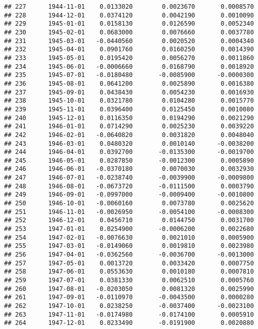 \documentclass[
]{article}
\begin{document}
\begin{verbatim}
## 227      1944-11-01    0.0133020        0.0023670       0.0008570
## 228      1944-12-01    0.0374120        0.0042190       0.0010090
## 229      1945-01-01    0.0158130        0.0126590       0.0052340
## 230      1945-02-01    0.0683000        0.0076660       0.0037780
## 231      1945-03-01   -0.0440560        0.0020520       0.0004340
## 232      1945-04-01    0.0901760        0.0160250       0.0014390
## 233      1945-05-01    0.0195420        0.0056270       0.0011860
## 234      1945-06-01   -0.0006660        0.0168790       0.0018920
## 235      1945-07-01   -0.0180480       -0.0085900      -0.0000300
## 236      1945-08-01    0.0641200        0.0025890       0.0016380
## 237      1945-09-01    0.0438430        0.0054230       0.0016930
## 238      1945-10-01    0.0321780        0.0104280       0.0015770
## 239      1945-11-01    0.0396400        0.0125450       0.0010080
## 240      1945-12-01    0.0116350        0.0194290       0.0021290
## 241      1946-01-01    0.0714290        0.0025230       0.0039220
## 242      1946-02-01   -0.0640820        0.0031820       0.0048040
## 243      1946-03-01    0.0480320        0.0010140      -0.0038200
## 244      1946-04-01    0.0392700       -0.0135300      -0.0019700
## 245      1946-05-01    0.0287850       -0.0012300       0.0005890
## 246      1946-06-01   -0.0370180        0.0070030       0.0032930
## 247      1946-07-01   -0.0238740       -0.0039900      -0.0009800
## 248      1946-08-01   -0.0673720       -0.0111500       0.0003790
## 249      1946-09-01   -0.0997000       -0.0009400      -0.0010800
## 250      1946-10-01   -0.0060160        0.0073780       0.0025620
## 251      1946-11-01   -0.0026950       -0.0054100      -0.0008300
## 252      1946-12-01    0.0456710        0.0144750       0.0031700
## 253      1947-01-01    0.0254900       -0.0006200       0.0022680
## 254      1947-02-01   -0.0076630        0.0021010       0.0005900
## 255      1947-03-01   -0.0149060        0.0019810       0.0023980
## 256      1947-04-01   -0.0362560       -0.0036700      -0.0013000
## 257      1947-05-01    0.0013720        0.0033420       0.0007750
## 258      1947-06-01    0.0553630        0.0010180       0.0007810
## 259      1947-07-01    0.0381330        0.0062510       0.0005760
## 260      1947-08-01   -0.0203050        0.0081320       0.0025990
## 261      1947-09-01   -0.0110970       -0.0043500       0.0000280
## 262      1947-10-01    0.0238250       -0.0037400      -0.0023100
## 263      1947-11-01   -0.0174980       -0.0174100       0.0005910
## 264      1947-12-01    0.0233490       -0.0191900       0.0020880

\end{verbatim}
\end{document}
